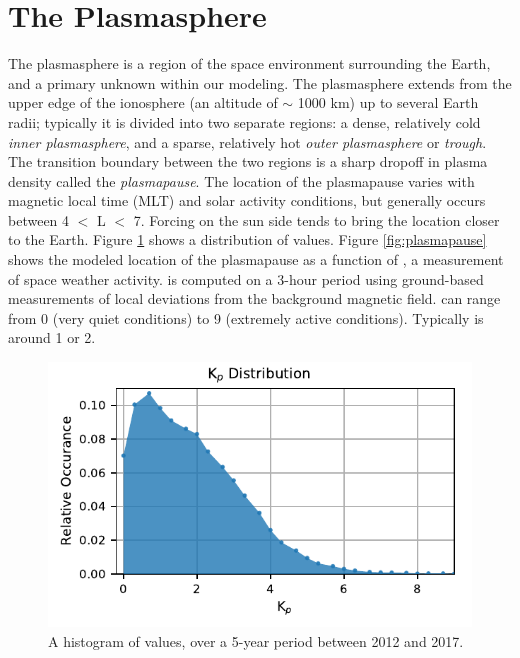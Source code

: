 \section{The Plasmasphere}
\label{section:plasmasphere_models}
The plasmasphere is a region of the space environment surrounding the Earth, and a primary unknown within our modeling. The plasmasphere extends from the upper edge of the ionosphere (an altitude of $\sim$ 1000 km) up to several Earth radii; typically it is divided into two separate regions: a dense, relatively cold \emph{inner plasmasphere}, and a sparse, relatively hot \emph{outer plasmasphere} or \emph{trough}. The transition boundary between the two regions is a sharp dropoff in plasma density called the \emph{plasmapause}. The location of the plasmapause varies with magnetic local time (MLT) and solar activity conditions, but generally occurs between 4 $<$ L $<$ 7. Forcing on the sun side tends to bring the location closer to the Earth. Figure \ref{fig:Kp_dist} shows a distribution of \kp{} values. Figure \ref{fig:plasmapause} shows the modeled location of the plasmapause as a function of \kp{}, a measurement of space weather activity. \kp{} is computed on a 3-hour period using ground-based measurements of local deviations from the background magnetic field. \kp{} can range from 0 (very quiet conditions) to 9 (extremely active conditions). Typically \kp{} is around 1 or 2. 

\begin{figure}[h]
\begin{center}
\includegraphics{figures/Kp_distribution.pdf}
\caption[Histogram of \kp{} data]{A histogram of \kp{} values, over a 5-year period between 2012 and 2017.}
\label{fig:Kp_dist}
\end{center}
\end{figure}

